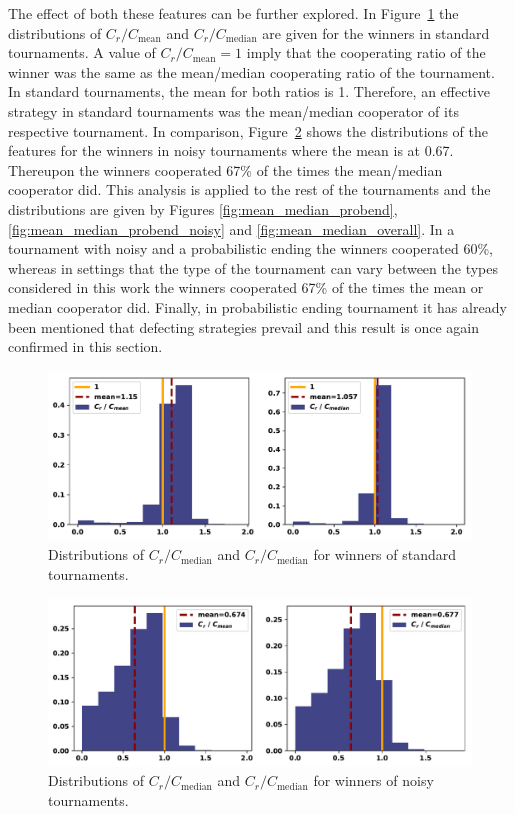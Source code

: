 \documentclass{article}
\begin{document}
The effect of both these features can be further explored. In
Figure~\ref{fig:mean_median_std} the distributions of \(C_r / C_{\text{mean}}\)
and \(C_r / C_{\text{median}}\) are given for the winners in standard tournaments. A value of \(C_r /
C_{\text{mean}} = 1\) imply that the cooperating ratio of the winner was the
same as the mean/median cooperating ratio of the tournament. In standard tournaments, the mean
for both ratios is 1. Therefore, an effective strategy in standard tournaments
was the mean/median cooperator of its respective tournament. In comparison,
Figure~\ref{fig:mean_median_noisy} shows the distributions of the features for
the winners in noisy tournaments where the mean is at 0.67. Thereupon the winners
cooperated 67\% of the times the mean/median cooperator did. This analysis is
applied to the rest of the tournaments and the distributions are given by
Figures \ref{fig:mean_median_probend}, \ref{fig:mean_median_probend_noisy} and
\ref{fig:mean_median_overall}. In a tournament with noisy and a probabilistic
ending the winners cooperated 60\%, whereas in settings that the type of the
tournament can vary between the types considered in this work the winners
cooperated 67\% of the times the mean or median cooperator did. Finally, in
probabilistic ending tournament it has already been mentioned that defecting
strategies prevail and this result is once again confirmed in this section.

\begin{figure}[!htbp]
    \centering
    \includegraphics[width=.5\textwidth]{../images/compared_to_mean_median_standard.pdf}
    \caption{Distributions of \(C_r / C_{\text{median}}\)
    and \(C_r / C_{\text{median}}\) for winners of standard tournaments.}\label{fig:mean_median_std}
\end{figure}

\begin{figure}[!htbp]
    \centering
    \includegraphics[width=.5\textwidth]{../images/compared_to_mean_median_noisy.pdf}
    \caption{Distributions of \(C_r / C_{\text{median}}\)
    and \(C_r / C_{\text{median}}\) for winners of noisy tournaments.}\label{fig:mean_median_noisy}
\end{figure}
\end{document}
